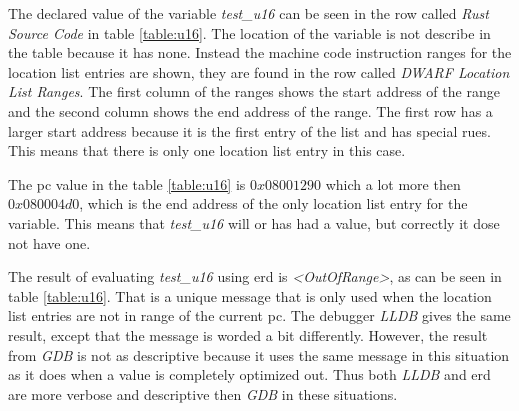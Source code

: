 The declared value of the variable \emph{test\_u16} can be seen in the row called \emph{Rust Source Code} in table \ref{table:u16}.
The location of the variable is not describe in the table because it has none.
Instead the machine code instruction ranges for the location list entries are shown, they are found in the row called \emph{DWARF Location List Ranges}.
The first column of the ranges shows the start address of the range and the second column shows the end address of the range.
The first row has a larger start address because it is the first entry of the list and has special rues.
This means that there is only one location list entry in this case.


The \gls{pc} value in the table \ref{table:u16} is $0x08001290$ which a lot more then $0x080004d0$, which is the end address of the only location list entry for the variable.
This means that \emph{test\_u16} will or has had a value, but correctly it dose not have one.


The result of evaluating \emph{test\_u16} using \gls{erd} is \emph{\textless OutOfRange\textgreater}, as can be seen in table \ref{table:u16}.
That is a unique message that is only used when the location list entries are not in range of the current \gls{pc}.
The debugger \emph{LLDB} gives the same result, except that the message is worded a bit differently.
However, the result from \emph{GDB} is not as descriptive because it uses the same message in this situation as it does when a value is completely optimized out.
Thus both \emph{LLDB} and \gls{erd} are more verbose and descriptive then \emph{GDB} in these situations.


